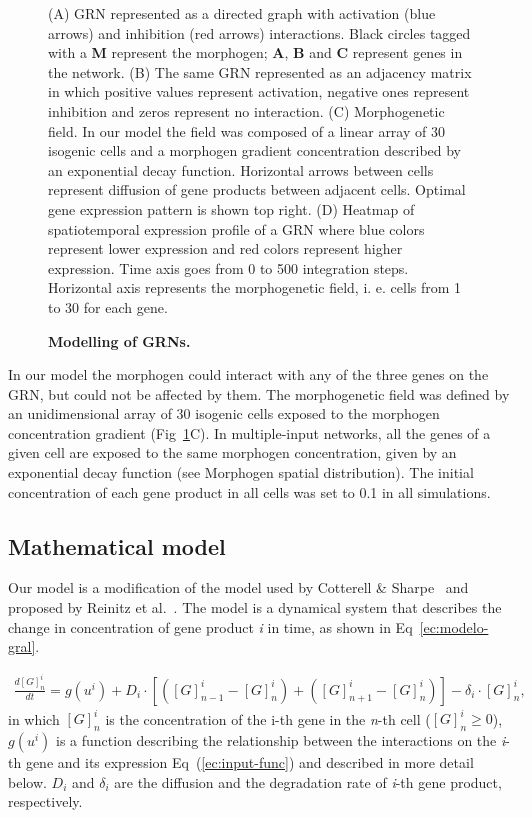 \documentclass[10pt,letterpaper]{article}
\begin{document}
\begin{figure}[!h]
    \caption{\bf Modelling of GRNs.}
    (A) GRN represented as a directed graph with activation (blue arrows) and
    inhibition (red arrows) interactions. Black circles
    tagged with a \textbf{M} represent the morphogen; \textbf{A}, \textbf{B} and
    \textbf{C} represent genes in the network.
    (B) The same GRN represented as an adjacency matrix in which positive values
    represent activation, negative ones represent inhibition and
    zeros represent no interaction.
    (C) Morphogenetic field. In our model the field was composed of a linear
    array of 30 isogenic cells and a morphogen gradient concentration described
    by an exponential decay function. Horizontal arrows between cells represent
    diffusion of gene products between adjacent cells. Optimal gene expression
    pattern is shown top right.
    (D) Heatmap of spatiotemporal expression profile of a GRN where blue
    colors represent lower expression and red colors represent higher
    expression. Time axis goes from 0 to 500 integration steps. Horizontal
    axis represents the morphogenetic field, i. e. cells from 1 to 30 for
    each gene.
 \label{fig:model}
\end{figure}

In our model the morphogen could interact with any of the three genes on the
GRN, but could not be affected by them. The morphogenetic field was defined
by an unidimensional array of 30 isogenic cells exposed to the morphogen
concentration gradient (Fig~\ref{fig:model}C). In multiple-input networks,
all the genes of a given cell are exposed to the same morphogen
concentration, given by an exponential decay function (see Morphogen
spatial distribution). The initial concentration of each gene product in
all cells was set to 0.1 in all simulations.\\

\subsection*{Mathematical model}

Our model is a modification of the model used by Cotterell \& Sharpe~\cite{Cotterell2010}
and proposed by Reinitz et al.~\cite{Reinitz1995}. The
model is a dynamical system that describes the change in concentration of gene
product \emph{i} in time, as shown in Eq~\ref{ec:modelo-gral}.

 \begin{eqnarray}
  \frac{d[G]^i_n}{dt}
  = g(u^i) + D_i \cdot [ ([G]^i_{n-1}-[G]^i_n) +([G]^i_{n+1}-[G]^i_n)]-\delta_i
  \cdot [ G ]^i_n ,
  \label{ec:modelo-gral}
 \end{eqnarray}
\noindent
in which $[G]^{i}_{n}$ is the concentration of the i-th gene in the \emph{n}-th
cell ($[G]^{i}_{n} ≥ 0$), $g(u^i)$ is a function describing the relationship
between the interactions on the \emph{i}-th gene and its expression
Eq~(\ref{ec:input-func}) and described in more detail below. $D_i$ and
$\delta_i$ are the diffusion and the degradation rate of \emph{i}-th gene
product, respectively.\\
\end{document}
